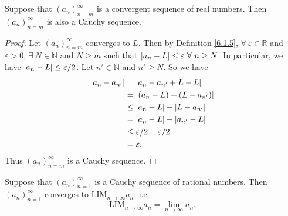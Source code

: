 \begin{proposition}\label{6.1.12}
Suppose that \((a_n)_{n = m}^\infty\) is a convergent sequence of real numbers.
Then \((a_n)_{n = m}^\infty\) is also a Cauchy sequence.
\end{proposition}

\begin{proof}
Let \((a_n)_{n = m}^\infty\) converges to \(L\).
Then by Definition \ref{6.1.5}, \(\forall\ \varepsilon \in \mathds{R}\) and \(\varepsilon > 0\), \(\exists\ N \in \mathds{N}\) and \(N \geq m\) such that \(\abs*{a_n - L} \leq \varepsilon \ \forall\ n \geq N\).
In particular, we have \(\abs*{a_n - L} \leq \varepsilon / 2\).
Let \(n' \in \mathds{N}\) and \(n' \geq N\).
So we have
\begin{align*}
\abs*{a_n - a_{n'}} &= \abs*{a_n - a_{n'} + L - L} \\
&= \abs*{(a_n - L) + (L - a_{n'})} \\
&\leq \abs*{a_n - L} + \abs*{L - a_{n'}} \\
&= \abs*{a_n - L} + \abs*{a_{n'} - L} \\
&\leq \varepsilon / 2 + \varepsilon / 2 \\
&= \varepsilon.
\end{align*}
Thus \((a_n)_{n = m}^\infty\) is a Cauchy sequence.
\end{proof}

\setcounter{theorem}{14}
\begin{proposition}\label{6.1.15}
Suppose that \((a_n)_{n = 1}^\infty\) is a Cauchy sequence of rational numbers.
Then \((a_n)_{n = 1}^\infty\) converges to \(\text{LIM}_{n \to \infty} a_n\), i.e.
\[
    \text{LIM}_{n \to \infty} a_n = \lim_{n \to \infty} a_n.
\]
\end{proposition}

